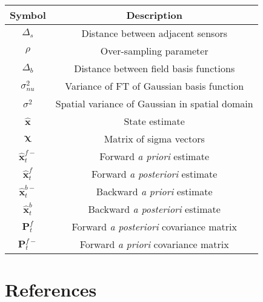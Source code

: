 \documentclass[12pt]{iopart}		%
\begin{document}
\begin{tabular}{c|c}
	\hline\hline
	Symbol & Description \\ \hline
	$\Delta_s$ & Distance between adjacent sensors \\
	$\rho$ & Over-sampling parameter \\	
	$\Delta_b$ & Distance between field basis functions \\	
	$\sigma_{nu}^2$ & Variance of FT of Gaussian basis function \\
	$\sigma^2$ & Spatial variance of Gaussian in spatial domain \\
	$\hat{\mathbf{x}}$ & State estimate \\
	$\boldsymbol{\chi}$ & Matrix of sigma vectors \\
	$\hat{\mathbf{x}}_t^{f-}$ & Forward \emph{a priori} estimate \\
	$\hat{\mathbf{x}}_t^f$ & Forward \emph{a posteriori} estimate \\
	$\hat{\mathbf{x}}_t^{b-}$ & Backward \emph{a priori} estimate \\
	$\hat{\mathbf{x}}_t^{b}$ & Backward \emph{a posteriori} estimate \\
	$\mathbf{P}^f_t$ & Forward \emph{a posteriori} covariance matrix \\
	$\mathbf{P}^{f-}_t$ & Forward \emph{a priori} covariance matrix \\	
\end{tabular}
\section*{References}



\end{document}
